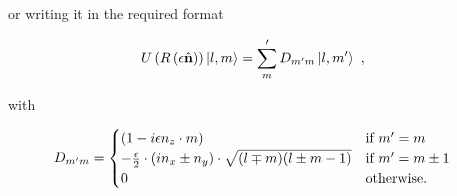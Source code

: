 or writing it in the required format

\begin{align}
    \Rotation{\epsilon}{\normalvector} \ket{l, m} &= \sum_m' D_{m'm} \ket{l, m'}~,
\end{align}

with

\begin{align}
    D_{m'm} &= 
    \begin{cases}
        (1 - \iota\epsilon n_z \cdot m) & \textnormal{if } m' = m \\
        -\frac{\epsilon}{2} \cdot (\iota n_x \pm n_y) \cdot \sqrt{(l \mp m)(l \pm m-1)}
                & \textnormal{if } m' = m \pm 1 \\
        0 & \textnormal{otherwise.}
    \end{cases}
\end{align}